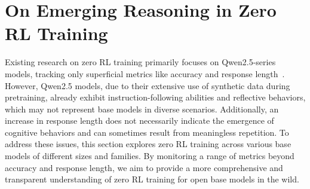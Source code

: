 \section{On Emerging Reasoning in Zero RL Training}

Existing research on zero RL training primarily focuses on Qwen2.5-series models, tracking only superficial metrics like accuracy and response length~\citep{zeng2025simplerl,OpenReasonerZero2025,yu2025dapoopensourcellmreinforcement}. However, Qwen2.5 models, due to their extensive use of synthetic data during pretraining, already exhibit instruction-following abilities and reflective behaviors, which may not represent base models in diverse scenarios. Additionally, an increase in response length does not necessarily indicate the emergence of cognitive behaviors and can sometimes result from meaningless repetition.
To address these issues, this section explores zero RL training across various base models of different sizes and families. By monitoring a range of metrics beyond accuracy and response length, we aim to provide a more comprehensive and transparent understanding of zero RL training for open base models in the wild.





